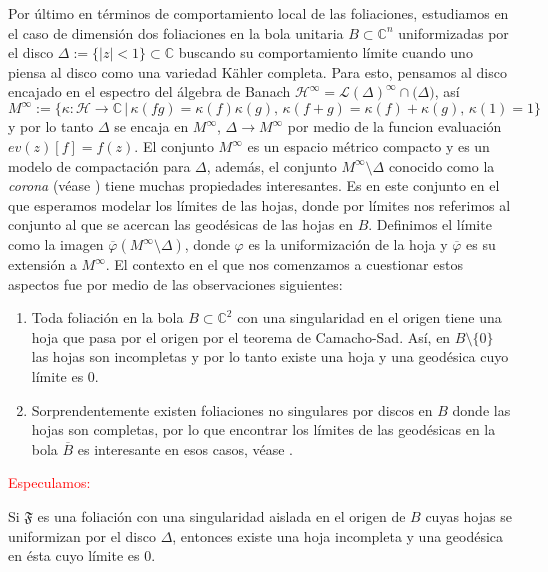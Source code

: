 \documentclass[letterpaper]{report}
\newcommand{\co}{\ensuremath{\mathbb C }}
\begin{document}
\vspace{1cm}

Por \'ultimo en t\'erminos de comportamiento local de las foliaciones, estudiamos en el caso de dimensi\'on dos foliaciones en 
la bola unitaria $B\subset\co^n$ uniformizadas por el disco $\Delta:=\{|z|< 1\}\subset\co$ buscando su comportamiento l\'imite cuando uno piensa
al disco como una variedad K\"ahler completa. Para esto, pensamos al disco encajado en el espectro del \'algebra de Banach 
$\mathcal{H}^{\infty}=\mathcal{L}(\Delta)^{\infty}\cap\mathcal(\Delta)$, as\'i \hbox{$M^{\infty}:=\{\kappa:\mathcal{H}\rightarrow\co\,|\,\kappa(fg)=\kappa(f)\kappa(g),\,\kappa(f+g)=\kappa(f)+\kappa(g),\,\kappa(1)=1\}$}
y por lo tanto $\Delta$ se encaja en $M^{\infty}$, $\Delta\rightarrow M^{\infty}$ por medio de la funcion evaluaci\'on $ev(z)[f]=f(z)$. 
El conjunto $M^{\infty}$ es un espacio m\'etrico compacto y es un modelo de compactaci\'on para $\Delta$, adem\'as, el conjunto $M^{\infty}\setminus\Delta$ conocido como 
la \textit{corona} (v\'ease \cite{SCHARK}) tiene muchas propiedades interesantes.
Es en este conjunto en el que esperamos modelar los l\'imites de las hojas, donde por l\'imites nos referimos al conjunto al que se 
acercan las geod\'esicas de las hojas en $B$. Definimos el l\'imite como la imagen $\overline{\varphi}(M^{\infty}\setminus\Delta)$, donde $\varphi$ es la uniformizaci\'on
de la hoja y $\overline{\varphi}$ es su extensi\'on a $M^{\infty}$. El contexto en el que nos comenzamos a cuestionar estos aspectos fue
por medio de las observaciones siguientes:
\begin{enumerate}
        \item Toda foliaci\'on en la bola $B\subset\co^2$ con una singularidad en el origen tiene una hoja que pasa por el origen
        por el teorema de Camacho-Sad. As\'i, en $B\setminus\{0\}$ las hojas son incompletas y por lo tanto existe una hoja
        y una geod\'esica cuyo l\'imite es $0$.
        \item Sorprendentemente existen foliaciones no singulares por discos en $B$ donde las hojas son completas, por lo que 
        encontrar los l\'imites de las geod\'esicas en la bola $\overline{B}$ es interesante en esos casos, v\'ease \cite{A-F}.
\end{enumerate}
                                        \textcolor{red}{\centerline{Especulamos:}}
Si $\mathfrak{F}$ es una foliaci\'on con una singularidad aislada en el origen de $B$ cuyas hojas se uniformizan por el disco $\Delta$,
entonces existe una hoja incompleta y una geod\'esica en \'esta cuyo l\'imite es $0$.  
\end{document}
